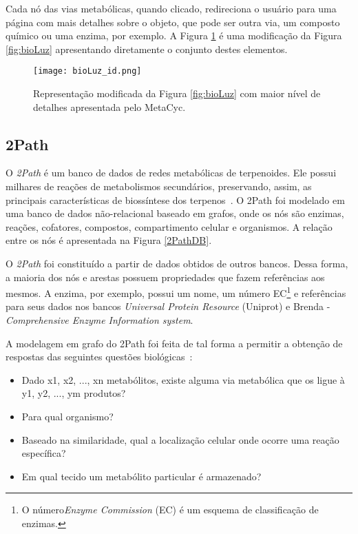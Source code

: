 \indent Cada nó das vias metabólicas, quando clicado, redireciona o usuário para uma página com mais detalhes sobre o objeto, que pode ser outra via, um composto químico ou uma enzima, por exemplo. A Figura \ref{bioLuz_id} é uma modificação da Figura \ref{fig:bioLuz} apresentando diretamente o conjunto destes elementos. \\
\newpage
\begin{figure}[!h]
\centering
\texttt{[image: bioLuz\_id.png]}
\caption{Representação modificada da Figura \ref{fig:bioLuz} com maior nível de detalhes apresentada pelo MetaCyc.}
\label{bioLuz_id}
\end{figure}
\break


\subsection{2Path}

\indent O \textit{2Path} é um banco de dados de redes metabólicas de terpenoides. Ele possui milhares de reações de metabolismos secundários, preservando, assim, as principais características de biossíntese dos terpenos~\cite{waldeyr}. O 2Path foi modelado em uma banco de dados não-relacional baseado em grafos, onde os nós são enzimas, reações, cofatores, compostos, compartimento celular e organismos. A relação entre os nós é apresentada na Figura \ref{2PathDB}.

\indent O \textit{2Path} foi constituído a partir de dados obtidos de outros bancos. Dessa forma, a maioria dos nós e arestas possuem propriedades que fazem referências aos mesmos. A enzima, por exemplo, possui um nome, um número EC\footnote{O número\textit{Enzyme Commission} (EC) é um esquema de classificação de enzimas.} e referências para seus dados nos bancos \textit{Universal Protein Resource} (Uniprot) e Brenda - \textit{Comprehensive Enzyme Information system}. 


\indent A modelagem em grafo do 2Path foi feita de tal forma a permitir a obtenção de respostas das seguintes questões biológicas~\cite{waldeyr}:	

\begin{itemize}
\item Dado x{\small 1}, x{\small 2}, ..., x{\small n} metabólitos, existe alguma via metabólica que os ligue à y{\small 1}, y{\small 2}, ..., y{\small m} produtos?
\item Para qual organismo?
\item Baseado na similaridade, qual a localização celular onde ocorre uma reação específica?
\item Em qual tecido um metabólito particular é armazenado?
\end{itemize}

